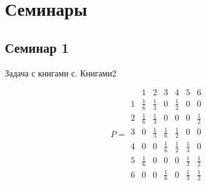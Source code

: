 \section{Семинары}

\subsection{Семинар 1}

Задача с книгами с.
Книгами2

\[
	P =
	\begin{array}{c|cccccc}
		  & 1            & 2            & 3            & 4            & 5            & 6            \\ \hline
		1 & \tfrac{1}{6} & \tfrac{1}{3} & 0            & \tfrac{1}{2} & 0            & 0            \\
		2 & \tfrac{1}{6} & \tfrac{1}{3} & 0            & 0            & 0            & \tfrac{1}{2} \\
		3 & 0            & \tfrac{1}{3} & \tfrac{1}{6} & \tfrac{1}{2} & 0            & 0            \\
		4 & 0            & 0            & \tfrac{1}{6} & \tfrac{1}{2} & \tfrac{1}{3} & 0            \\
		5 & \tfrac{1}{6} & 0            & 0            & 0            & \tfrac{1}{3} & \tfrac{1}{2} \\
		6 & 0            & 0            & \tfrac{1}{6} & 0            & \tfrac{1}{3} & \tfrac{1}{2}
	\end{array}
\]


